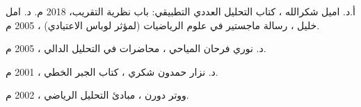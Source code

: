 \documentclass{arabicClass}
\begin{document}
	\setlength{\jot}{16pt}
	
	\belowdisplayskip=7pt
	\abovedisplayskip=7pt
	
	
	
	
	
	
	\tableofcontents
	\clearpage
	
	
	
	
	
	\begin{thebibliography}{9}
		أ.د. اميل شكرالله ، كتاب التحليل العددي التطبيقي: باب نظرية التقريب، 2018 م.
		د. امل خليل ، رسالة ماجستير في علوم الرياضيات (لمؤثر لوباس الاعتيادي) ، 2005 م.
		
		د. نوري فرحان المياحي ، محاضرات في التحليل الدالي ، 2005 م.
		
		د. نزار حمدون شكري ، كتاب الجبر الخطي ، 2001 م.
		
		ووتر دورن ، مبادئ التحليل الرياضي ، 2002 م.
	\end{thebibliography}
\end{document}
